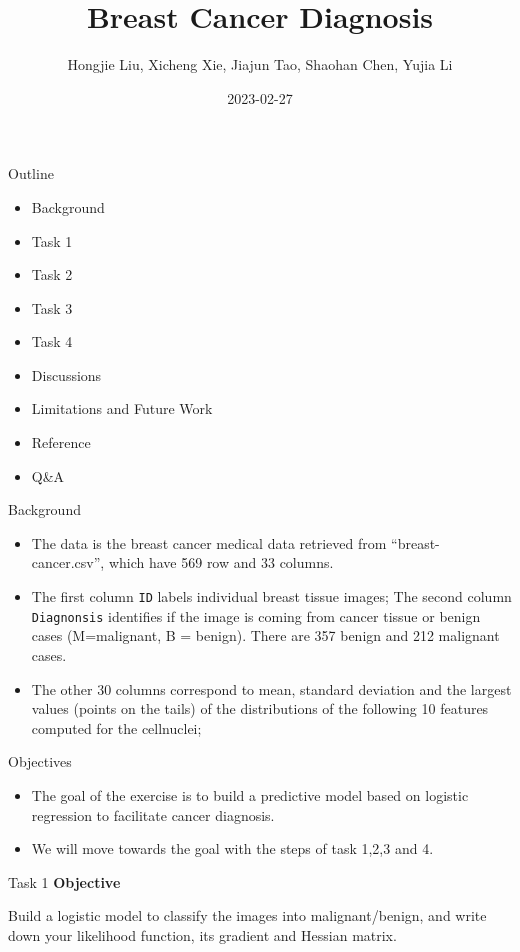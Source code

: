 \documentclass[
  ignorenonframetext,
]{beamer}
\title{Breast Cancer Diagnosis}
\author{Hongjie Liu, Xicheng Xie, Jiajun Tao, Shaohan Chen, Yujia Li}
\date{2023-02-27}
\providecommand{\tightlist}{%
  \setlength{\itemsep}{0pt}\setlength{\parskip}{0pt}}
\begin{document}
\frame{\titlepage}

\begin{frame}{Outline}
\protect\hypertarget{outline}{}
\begin{itemize}
\item
  Background
\item
  Task 1
\item
  Task 2
\item
  Task 3
\item
  Task 4
\item
  Discussions
\item
  Limitations and Future Work
\item
  Reference
\item
  Q\&A
\end{itemize}
\end{frame}

\begin{frame}[fragile]{Background}
\protect\hypertarget{background}{}
\begin{itemize}
\tightlist
\item
  The data is the breast cancer medical data retrieved from
  ``breast-cancer.csv'', which have 569 row and 33 columns.\\
\item
  The first column \texttt{ID} labels individual breast tissue images;
  The second column \texttt{Diagnonsis} identifies if the image is
  coming from cancer tissue or benign cases (M=malignant, B = benign).
  There are 357 benign and 212 malignant cases.
\item
  The other 30 columns correspond to mean, standard deviation and the
  largest values (points on the tails) of the distributions of the
  following 10 features computed for the cellnuclei;
\end{itemize}
\end{frame}

\begin{frame}{Objectives}
\protect\hypertarget{objectives}{}
\begin{itemize}
\item
  The goal of the exercise is to build a predictive model based on
  logistic regression to facilitate cancer diagnosis.
\item
  We will move towards the goal with the steps of task 1,2,3 and 4.
\end{itemize}
\end{frame}

\begin{frame}{Task 1}
\protect\hypertarget{task-1}{}
\textbf{Objective}

Build a logistic model to classify the images into malignant/benign, and
write down your likelihood function, its gradient and Hessian matrix.
\end{frame}
\end{document}
